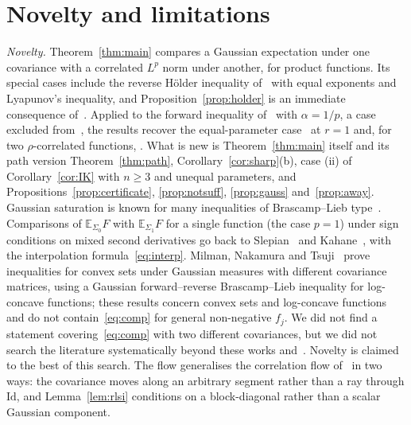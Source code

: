 \documentclass[11pt]{amsart}
\theoremstyle{definition}
\newcommand{\E}{\mathbb{E}}
\newcommand{\Id}{\mathrm{Id}}
\begin{document}
\section{Novelty and limitations}
\emph{Novelty.} Theorem~\ref{thm:main} compares a Gaussian expectation under one covariance with a correlated $L^p$
norm under another, for product functions. Its special cases include the reverse H\"older inequality
of~\cite{CDP15} with equal exponents and Lyapunov's inequality, and Proposition~\ref{prop:holder} is an immediate
consequence of~\cite{CDP15}. Applied to the forward inequality of~\cite{IK25} with $\alpha=1/p$, a case excluded
from~\cite[Thm.~9(i)]{IK25}, the results recover the equal-parameter case~\cite[Thm.~1.1]{FR} at $r=1$ and, for two
$\rho$-correlated functions, \cite[Prop.~6.1]{FR}. What is new is Theorem~\ref{thm:main} itself and its path
version Theorem~\ref{thm:path}, Corollary~\ref{cor:sharp}(b), case (ii) of Corollary~\ref{cor:IK} with $n\ge3$ and unequal
parameters, and Propositions~\ref{prop:certificate}, \ref{prop:notsuff}, \ref{prop:gauss} and~\ref{prop:away}.
Gaussian saturation is known for many inequalities of Brascamp--Lieb type~\cite{Lieb90,Bar98,CDP15,CL21,BW22,NT25}.
Comparisons of $\E_{\Sigma_0}F$ with $\E_{\Sigma_1}F$ for a single function (the case $p=1$) under sign conditions on
mixed second derivatives go back to Slepian~\cite{Sle62} and Kahane~\cite{Kah86}, with the interpolation
formula~\eqref{eq:interp}. Milman, Nakamura and Tsuji~\cite{MNT26} prove inequalities for convex sets under Gaussian
measures with different covariance matrices, using a Gaussian forward--reverse Brascamp--Lieb inequality for
log-concave functions; these results concern convex sets and log-concave functions and do not
contain~\eqref{eq:comp} for general non-negative $f_j$. We did not find a statement covering~\eqref{eq:comp} with two
different covariances, but we did not search the literature systematically beyond these works
and~\cite{Ledoux14}. Novelty is claimed to the best of this search. The flow generalises the correlation flow
of~\cite[Section~4]{FR} in two ways: the covariance moves along an arbitrary segment rather than a ray through $\Id$,
and Lemma~\ref{lem:rlsi} conditions on a block-diagonal rather than a scalar Gaussian component.
\end{document}
